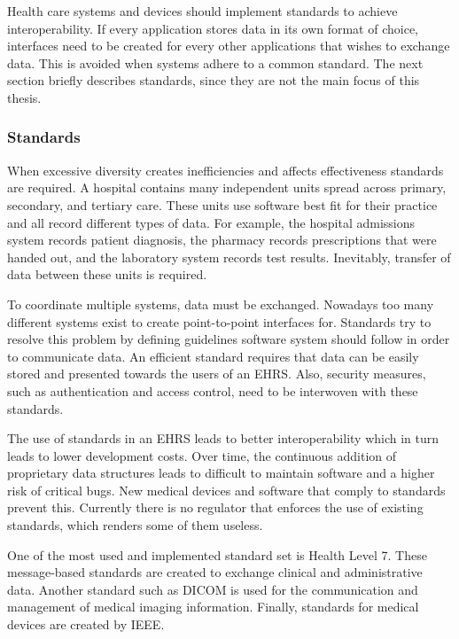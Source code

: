     \noindent Health care systems and devices should implement standards to achieve interoperability. If every application stores data in its own format of choice, interfaces need to be created for every other applications that wishes to exchange data. This is avoided when systems adhere to a common standard. The next section briefly describes standards, since they are not the main focus of this thesis.

        \subsubsection{Standards}\label{standards}

        When excessive diversity creates inefficiencies and affects effectiveness standards are required\cite{Shortliffe2014}. A hospital contains many independent units spread across primary, secondary, and tertiary care. These units use software best fit for their practice and all record different types of data. For example, the hospital admissions system records patient diagnosis, the pharmacy records prescriptions that were handed out, and the laboratory system records test results. Inevitably, transfer of data between these units is required. 

        To coordinate multiple systems, data must be exchanged. Nowadays too many different systems exist to create point-to-point interfaces for. Standards try to resolve this problem by defining guidelines software system should follow in order to communicate data. An efficient standard requires that data can be easily stored and presented towards the users of an EHRS\@. Also, security measures, such as authentication and access control, need to be interwoven with these standards.

        The use of standards in an EHRS leads to better interoperability which in turn leads to lower development costs. Over time, the continuous addition of proprietary data structures leads to difficult to maintain software and a higher risk of critical bugs. New medical devices and software that comply to standards prevent this. Currently there is no regulator that enforces the use of existing standards, which renders some of them useless.

        One of the most used and implemented standard set is Health Level 7. These message-based standards are created to exchange clinical and administrative data. Another standard such as DICOM is used for the communication and management of medical imaging information\cite{Mildenberger2002}. Finally, standards for medical devices are created by IEEE\cite{Shortliffe2014}.

